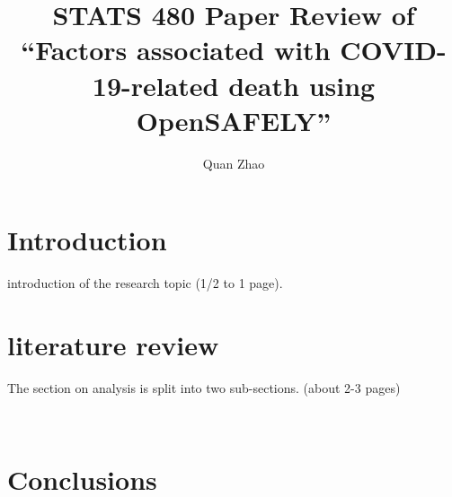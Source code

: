 \documentclass{article}
\begin{document}
\title{STATS 480 Paper Review of ``Factors associated with COVID-19-related
death using OpenSAFELY''}

\author{Quan Zhao}

\maketitle

\pagebreak



\section{Introduction}
introduction of the research topic
(1/2 to 1 page).

\section{literature review}
The section on analysis is split into two sub-sections. 
(about 2-3 pages)

~\cite{williamson2020factors}

\section{Conclusions}


\end{document}
